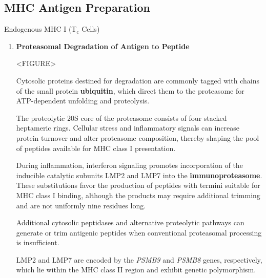   \subsection{MHC Antigen Preparation}

    \begin{core}[label=core:endogenous_mhci]{Endogenous MHC I (T$_{\text{c}}$ Cells)}

      \begin{enumerate}[label=(\arabic*)]

        \item \textbf{Proteasomal Degradation of Antigen to Peptide}

          <FIGURE>

          Cytosolic proteins destined for degradation are commonly tagged with chains of the small protein \textbf{ubiquitin}, which direct them to the proteasome for ATP-dependent unfolding and proteolysis.

          The proteolytic 20S core of the proteasome consists of four stacked heptameric rings. Cellular stress and inflammatory signals can increase protein turnover and alter proteasome composition, thereby shaping the pool of peptides available for MHC class I presentation.

          During inflammation, interferon signaling promotes incorporation of the inducible catalytic subunits LMP2 and LMP7 into the \textbf{immunoproteasome}. These substitutions favor the production of peptides with termini suitable for MHC class I binding, although the products may require additional trimming and are not uniformly nine residues long.

          Additional cytosolic peptidases and alternative proteolytic pathways can generate or trim antigenic peptides when conventional proteasomal processing is insufficient.

          LMP2 and LMP7 are encoded by the \textit{PSMB9} and \textit{PSMB8} genes, respectively, which lie within the MHC class II region and exhibit genetic polymorphism.


\end{enumerate}
\end{core}
